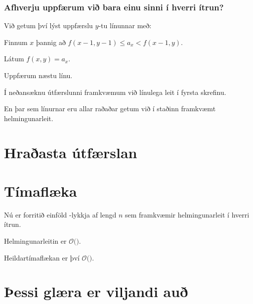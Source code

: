 {
    \frametitle{Afhverju uppfærum við bara einu sinni í hverri ítrun?}
    {
        \item<1-> Við getum því lýst uppfærslu $y$-tu línunnar með:
        {
            \item<2-> Finnum $x$ þannig að $f(x - 1, y - 1) \leq a_x < f(x - 1, y)$.
            \item<3-> Látum $f(x, y) = a_x$.
            \item<4-> Uppfærum næstu línu.
        }
        \item<5-> Í neðansæknu útfærslunni framkvæmum við línulega leit í fyrsta skrefinu.
        \item<6-> En þar sem línurnar eru allar raðaðar getum við í staðinn framkvæmt helmingunarleit.
    }
}

\section{Hraðasta útfærslan}
{
}

\section{Tímaflæka}
{
    {
        \item<1-> Nú er forritið einföld -lykkja af lengd $n$ sem framkvæmir helmingunarleit í hverri ítrun.
        \item<2-> Helmingunarleitin er $\mathcal{O}($$)$.
        \item<4-> Heildartímaflækan er því $\mathcal{O}($$)$.
    }
}

\section{Þessi glæra er viljandi auð}
{
}


